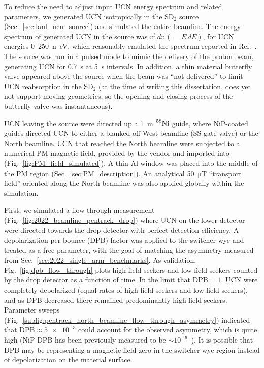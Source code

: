 To reduce the need to adjust input UCN energy spectrum and related parameters, we generated UCN isotropically in the SD$_2$ source (Sec.~\ref{sec:lanl_ucn_source}) and simulated the entire beamline. The energy spectrum of generated UCN in the source was $v^3\,dv\,(=E\,dE)$, for UCN energies 0--\qty{250}{n\eV}, which reasonably emulated the spectrum reported in Ref.~\cite{saunders_performance_2013}. The source was run in a pulsed mode to mimic the delivery of the proton beam, generating UCN for \qty{0.7}{s} at \qty{5}{s} intervals. In addition, a thin material butterfly valve appeared above the source when the beam was ``not delivered'' to limit UCN reabsorption in the SD$_2$ (at the time of writing this dissertation, \pentrack does yet not support moving geometries, so the opening and closing process of the butterfly valve was instantaneous).

UCN leaving the source were directed up a \qty{1}{m} $\ce{^{58}Ni}$ guide, where NiP-coated guides directed UCN to either a blanked-off West beamline (SS gate valve) or the North beamline. UCN that reached the North beamline were subjected to a numerical PM magnetic field, provided by the vendor and imported into \pentrack (Fig.~\ref{fig:PM_field_simulated}). A thin Al window was placed into the middle of the PM region (Sec.~\ref{sec:PM_description}). An analytical \qty{50}{\micro T} ``transport field'' oriented along the North beamline was also applied globally within the simulation.

First, we simulated a flow-through measurement (Fig.~\ref{fig:2022_beamline_pentrack_drop}) where UCN on the lower detector were directed towards the drop detector with perfect detection efficiency. A depolarization per bounce (DPB) factor was applied to the switcher wye and treated as a free parameter, with the goal of matching the asymmetry measured from Sec.~\ref{sec:2022_single_arm_benchmarks}. As validation, Fig.~\ref{fig:dpb_flow_through} plots high-field seekers and low-field seekers counted by the drop detector as a function of time. In the limit that $\text{DPB}=1$, UCN were completely depolarized (equal rates of high-field seekers and low field seekers), and as DPB decreased there remained predominantly high-field seekers. Parameter sweeps (Fig.~\ref{subfig:pentrack_north_beamline_flow_through_asymmetry}) indicated that $\text{DPB}\approx \num{5e-3}$ could account for the observed asymmetry, which is quite high (NiP DPB has been previously measured to be $\sim 10^{-6}$~\cite{tang_measurement_2016}). It is possible that DPB may be representing a magnetic field zero in the switcher wye region instead of depolarization on the material surface.

